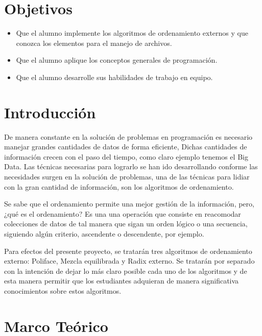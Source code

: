 \documentclass[letterpaper,12pt]{extarticle}
\begin{document}
  \newpage
    \tableofcontents
      \newpage


\section{Objetivos}
\begin{itemize}

\item Que el alumno implemente los algoritmos de ordenamiento externos y que conozca los elementos para el manejo de archivos.
\item Que el alumno aplique los conceptos generales de programación.
\item Que el alumno desarrolle sus habilidades de trabajo en equipo.

\end{itemize}

\pagebreak

\section{Introducción}
 \noindent De manera constante en la solución de problemas en programación es necesario manejar grandes cantidades de datos de forma eficiente, Dichas cantidades de información crecen con el paso del tiempo, como claro ejemplo tenemos el Big Data. Las técnicas necesarias para lograrlo se han ido desarrollando conforme las necesidades surgen en la solución de problemas, una de las técnicas para lidiar con la gran cantidad de información, son los algoritmos de ordenamiento.
 
Se sabe que el ordenamiento permite una mejor gestión de la información, pero, ¿qué es el ordenamiento? Es una una operación que consiste en reacomodar colecciones de datos de tal manera que sigan un orden lógico o una secuencia, siguiendo algún criterio, ascendente o descendente, por ejemplo.

Para efectos del presente proyecto, se tratarán tres algoritmos de ordenamiento externo: Poliface, Mezcla equilibrada y Radix externo. Se tratarán por separado con la intención de dejar lo más claro posible cada uno de los algoritmos y de esta manera permitir que los estudiantes adquieran de manera significativa conocimientos sobre estos algoritmos.

\pagebreak

\section{Marco Teórico}
\end{document}
